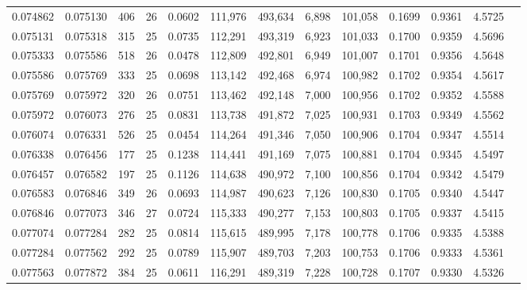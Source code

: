 \begin{tabular}{rrrrrrrrrrrrr}
0.074862 & 0.075130 & 406 &  26 &                                     0.0602 & 111,976 & 493,634 &   6,898 & 101,058 & 0.1699 & 0.9361 & 4.5725 \\
0.075131 & 0.075318 & 315 &  25 &                                     0.0735 & 112,291 & 493,319 &   6,923 & 101,033 & 0.1700 & 0.9359 & 4.5696 \\
0.075333 & 0.075586 & 518 &  26 &                                     0.0478 & 112,809 & 492,801 &   6,949 & 101,007 & 0.1701 & 0.9356 & 4.5648 \\
0.075586 & 0.075769 & 333 &  25 &                                     0.0698 & 113,142 & 492,468 &   6,974 & 100,982 & 0.1702 & 0.9354 & 4.5617 \\
0.075769 & 0.075972 & 320 &  26 &                                     0.0751 & 113,462 & 492,148 &   7,000 & 100,956 & 0.1702 & 0.9352 & 4.5588 \\
0.075972 & 0.076073 & 276 &  25 &                                     0.0831 & 113,738 & 491,872 &   7,025 & 100,931 & 0.1703 & 0.9349 & 4.5562 \\
0.076074 & 0.076331 & 526 &  25 &                                     0.0454 & 114,264 & 491,346 &   7,050 & 100,906 & 0.1704 & 0.9347 & 4.5514 \\
0.076338 & 0.076456 & 177 &  25 &                                     0.1238 & 114,441 & 491,169 &   7,075 & 100,881 & 0.1704 & 0.9345 & 4.5497 \\
0.076457 & 0.076582 & 197 &  25 &                                     0.1126 & 114,638 & 490,972 &   7,100 & 100,856 & 0.1704 & 0.9342 & 4.5479 \\
0.076583 & 0.076846 & 349 &  26 &                                     0.0693 & 114,987 & 490,623 &   7,126 & 100,830 & 0.1705 & 0.9340 & 4.5447 \\
0.076846 & 0.077073 & 346 &  27 &                                     0.0724 & 115,333 & 490,277 &   7,153 & 100,803 & 0.1705 & 0.9337 & 4.5415 \\
0.077074 & 0.077284 & 282 &  25 &                                     0.0814 & 115,615 & 489,995 &   7,178 & 100,778 & 0.1706 & 0.9335 & 4.5388 \\
0.077284 & 0.077562 & 292 &  25 &                                     0.0789 & 115,907 & 489,703 &   7,203 & 100,753 & 0.1706 & 0.9333 & 4.5361 \\
0.077563 & 0.077872 & 384 &  25 &                                     0.0611 & 116,291 & 489,319 &   7,228 & 100,728 & 0.1707 & 0.9330 & 4.5326 \\

\end{tabular}
